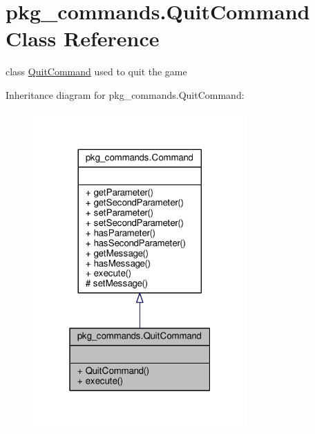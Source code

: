 \hypertarget{classpkg__commands_1_1QuitCommand}{\section{pkg\-\_\-commands.\-Quit\-Command Class Reference}
\label{classpkg__commands_1_1QuitCommand}
}


class \hyperlink{classpkg__commands_1_1QuitCommand}{Quit\-Command} used to quit the game  




Inheritance diagram for pkg\-\_\-commands.\-Quit\-Command\-:
\nopagebreak
\begin{figure}[H]
\begin{center}
\leavevmode
\includegraphics[width=232pt]{classpkg__commands_1_1QuitCommand__inherit__graph}
\end{center}
\end{figure}


